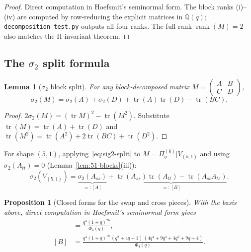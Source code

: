 \documentclass[11pt]{article}
\theoremstyle{plain}
\newtheorem{lemma}[theorem]{Lemma}
\newtheorem{proposition}[theorem]{Proposition}
\theoremstyle{definition}
\theoremstyle{remark}
\newcommand{\Q}{\mathbb{Q}}
\newcommand{\Pibs}{\Pi_q}
\newcommand{\trace}{\operatorname{tr}}
\begin{document}
\begin{proof}
Direct computation in Hoefsmit's seminormal form. The block ranks (i)--(iv)
are computed by row-reducing the explicit matrices in $\Q(q)$;
\verb|decomposition_test.py| outputs all four ranks.
The full rank $\operatorname{rank}(M) = 2$ also matches the H-invariant
theorem.
\end{proof}

\subsection{The $\sigma_2$ split formula}

\begin{lemma}[$\sigma_2$ block split]\label{lem:51-split}
For any block-decomposed matrix
$M = \left(\begin{smallmatrix}A & B \\ C & D\end{smallmatrix}\right)$,
\begin{equation}\label{eq:sig2-split}
  \sigma_2(M) = \sigma_2(A) + \sigma_2(D) + \trace(A)\trace(D) - \trace(BC).
\end{equation}
\end{lemma}

\begin{proof}
$2\sigma_2(M) = (\trace M)^2 - \trace(M^2)$. Substitute
$\trace(M) = \trace(A) + \trace(D)$ and
$\trace(M^2) = \trace(A^2) + 2\trace(BC) + \trace(D^2)$.
\end{proof}

For shape $(5,1)$, applying~\eqref{eq:sig2-split} to
$M = \Pibs^{(6)}|V_{(5,1)}$ and using $\sigma_2(A_{tt}) = 0$
(Lemma~\ref{lem:51-blocks}(iii)):
\begin{equation}\label{eq:51-AB}
  \sigma_2(V_{(5,1)})
    = \underbrace{\sigma_2(A_{ss})}_{=:[A]} + \underbrace{\trace(A_{ss})\trace(A_{tt}) - \trace(A_{st} A_{ts})}_{=:[B]}.
\end{equation}

\begin{proposition}[Closed forms for the swap and cross pieces]\label{prop:51-closed}
With the basis above, direct computation in Hoefsmit's seminormal form gives
\begin{align*}
  [A] &= \frac{q^3 (1+q)^{26}}{\Phi_4(q)}, \\
  [B] &= \frac{q^4 (1+q)^{18} \,(q^2+4q+1)\,(4q^4+9q^3+4q^2+9q+4)}{\Phi_4(q)}.
\end{align*}
\end{proposition}
\end{document}
